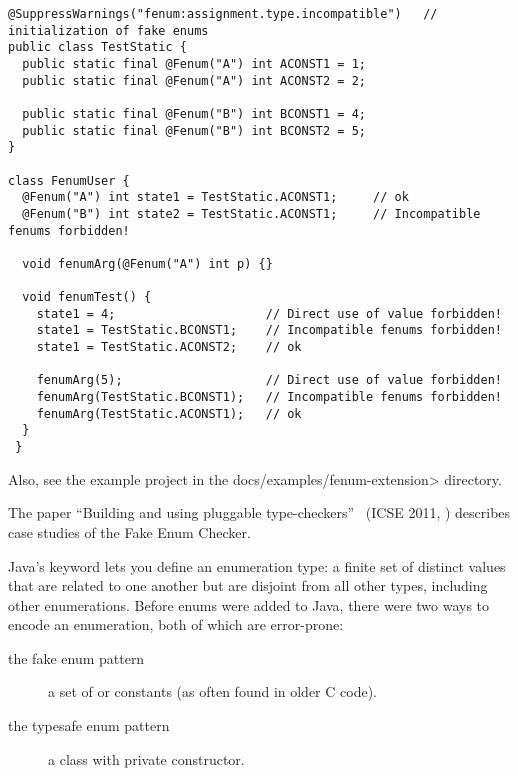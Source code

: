 \begin{Verbatim}
@SuppressWarnings("fenum:assignment.type.incompatible")   // initialization of fake enums
public class TestStatic {
  public static final @Fenum("A") int ACONST1 = 1;
  public static final @Fenum("A") int ACONST2 = 2;

  public static final @Fenum("B") int BCONST1 = 4;
  public static final @Fenum("B") int BCONST2 = 5;
}

class FenumUser {
  @Fenum("A") int state1 = TestStatic.ACONST1;     // ok
  @Fenum("B") int state2 = TestStatic.ACONST1;     // Incompatible fenums forbidden!

  void fenumArg(@Fenum("A") int p) {}

  void fenumTest() {
    state1 = 4;                     // Direct use of value forbidden!
    state1 = TestStatic.BCONST1;    // Incompatible fenums forbidden!
    state1 = TestStatic.ACONST2;    // ok

    fenumArg(5);                    // Direct use of value forbidden!
    fenumArg(TestStatic.BCONST1);   // Incompatible fenums forbidden!
    fenumArg(TestStatic.ACONST1);   // ok
  }
 }
\end{Verbatim}

Also, see the example project in the \<docs/examples/fenum-extension> directory.

The paper ``Building and using pluggable
type-checkers''~\cite{DietlDEMS2011} (ICSE 2011,
)
describes case studies of the Fake Enum Checker.



Java's
\href{https://docs.oracle.com/javase/specs/jls/se11/html/jls-8.html#jls-8.9}{}
keyword lets you define an enumeration type: a finite set of distinct values
that are related to one another but are disjoint from all other
types, including other enumerations.
Before enums were added to Java, there were two ways to encode an
enumeration, both of which are error-prone:

\begin{description}
\item[the fake enum pattern]  a set of  or 
  constants (as often found in older C code).

\item[the typesafe enum pattern]  a class with private constructor.
\end{description}

